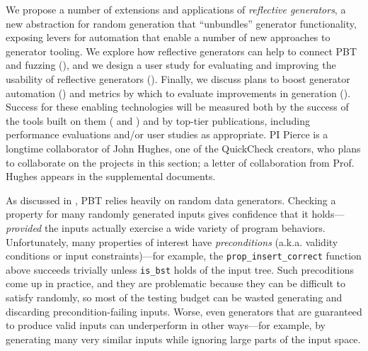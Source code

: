 We propose a number of extensions and applications of {\em reflective
generators}, a new abstraction for random generation that
``unbundles'' generator
functionality, exposing levers for
automation that enable a number of new approaches to generator
tooling. We explore how reflective generators can
help to connect PBT and fuzzing (),
and we design
a user study for evaluating and improving the usability of reflective
generators (). Finally, we discuss
plans to boost generator automation () and metrics
by which to evaluate improvements in generation ().
Success for these enabling technologies will be measured both by the success of
the tools built on them ( and )
and by top-tier publications, including performance evaluations and/or
user studies as appropriate.
PI Pierce is a longtime collaborator of John Hughes, one of the
QuickCheck creators, who plans to collaborate on the projects
in this section; a letter of collaboration from Prof.{} Hughes appears
in the supplemental documents.

As discussed in , PBT relies heavily on {random data
generators}.  Checking a property for many randomly generated inputs
gives confidence that it holds---{\em provided} the inputs actually
exercise a wide variety of program behaviors.
Unfortunately,
many properties of interest have {\em preconditions}
({a.k.a.} {validity conditions} or {input constraints})---for example,
the \verb|prop_insert_correct| function above succeeds trivially unless
\verb|is_bst| holds of the input tree.  Such precoditions come up in
practice, and they are problematic because they can be
difficult to satisfy randomly, so most of the testing budget
can be wasted generating and discarding precondition-failing inputs.
%
%
Worse, even generators that are guaranteed to produce valid
inputs can underperform in other ways---for example, by
generating many very similar inputs while ignoring large parts of
the input space.

